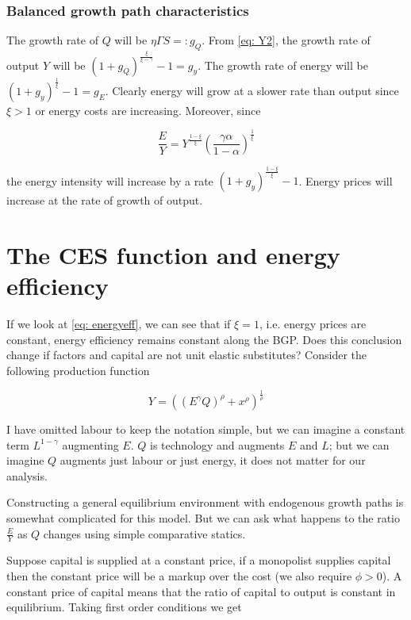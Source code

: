 \documentclass[12pt,english]{article}
\theoremstyle{definition}
\theoremstyle{plain}
\theoremstyle{plain}
\theoremstyle{remark}
\theoremstyle{definition}
\theoremstyle{plain}
\theoremstyle{plain}
\theoremstyle{remark}
\theoremstyle{plain}
\theoremstyle{remark}
\theoremstyle{plain}
\theoremstyle{plain}
\theoremstyle{plain}
\begin{document}
\subsubsection{Balanced growth path characteristics}

The growth rate of $Q$ will be $\eta\Gamma S =\colon g_{Q}$. From \eqref{eq: Y2}, the growth rate of output $Y$ will be $\left(1+g_{Q}\right)^{\frac{\xi}{\xi-\gamma}}-1 = g_{y}$. The growth rate of energy will be $\left(1+g_{y}\right)^{\frac{1}{\xi}}-1 = g_{E} $. Clearly energy will grow at a slower rate than output since $\xi>1$ or energy costs are increasing. Moreover, since 

\begin{equation}\label{eq: energyeff}
\frac{E}{Y} = Y^{\frac{1-\xi}{\xi}}\left(\frac{\gamma\alpha}{1-\alpha}\right)^{\frac{1}{\xi}}
\end{equation}

the energy intensity will increase by a rate $\left(1+g_{y}\right)^{\frac{1-\xi}{\xi}}-1$. Energy prices will increase at the rate of growth of output. 


\section{The CES function and energy efficiency}

If we look at \ref{eq: energyeff}, we can see that if $\xi = 1$, i.e. energy prices are constant, energy efficiency remains constant along the BGP. Does this conclusion change if factors and capital are not unit elastic substitutes? Consider the following production function

\begin{equation}\label{eq: product}
Y  = \left( \left(E^{\gamma}Q\right)^{\rho} + x^{\rho}\right)^{\frac{1}{\rho}}
\end{equation}

I have omitted labour to keep the notation simple, but we can imagine a constant term $L^{1-\gamma}$ augmenting $E$. $Q$ is technology and augments $E$ and $L$; but we can imagine $Q$ augments just labour or just energy, it does not matter for our analysis. 

Constructing a general equilibrium environment with endogenous growth paths is somewhat complicated for this model. But we can ask what happens to the ratio $\frac{E}{Y}$ as $Q$ changes using simple comparative statics. 

Suppose capital is supplied at a constant price, if a monopolist supplies capital then the constant price will be a markup over the cost (we also require $\phi>0$). A constant price of capital means that the ratio of capital to output is constant in equilibrium. Taking first order conditions we get 
\end{document}
